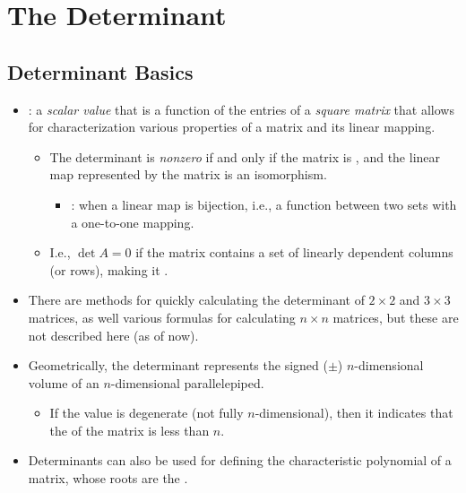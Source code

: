 \chapter{The Determinant}\label{The Determinant}
\section{Determinant Basics}\label{Determinant Basics}
\begin{itemize}
  \item {}: a \emph{scalar value} that is a function of the entries of a \emph{square matrix} that allows for characterization various properties of a matrix and its linear mapping.
    \begin{itemize}
      \item The determinant is \emph{nonzero} if and only if the matrix is \hyperref[Matrix Inverse]{}, and the linear map represented by the matrix is an isomorphism.
        \begin{itemize}
          \item {}: when a linear map is bijection, i.e., a function between two sets with a one-to-one mapping. 
        \end{itemize}
      \item I.e., \(\det{A}=0\) if the matrix contains a set of linearly dependent columns (or rows), making it \hyperref[Matrix Inverse]{}. 
    \end{itemize}
  \item There are methods for quickly calculating the determinant of \(2\times 2\) and \(3\times 3\) matrices, as well various formulas for calculating \(n \times n\) matrices, but these are not described here (as of now).
  
  \item Geometrically, the determinant represents the signed (\(\pm \)) \(n\)-dimensional volume of an \(n\)-dimensional parallelepiped.
    \begin{itemize}
      \item If the value is degenerate (not fully \(n\)-dimensional), then it indicates that the \hyperref[Column Space]{} of the matrix is less than \(n\).
    \end{itemize}
  \item Determinants can also be used for defining the characteristic polynomial of a matrix, whose roots are the \hyperref[Eigendecomposition]{}.
  

\end{itemize}
